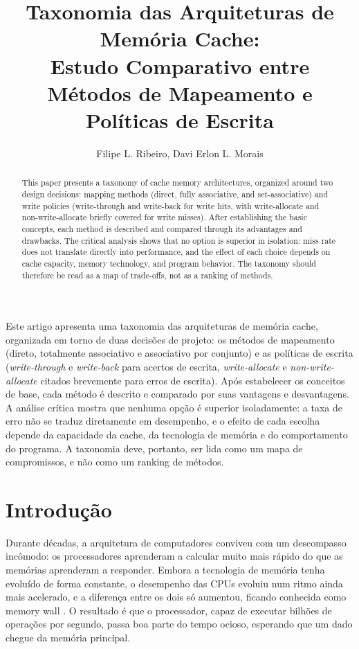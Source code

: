 \documentclass[12pt]{article}
\title{Taxonomia das Arquiteturas de Memória Cache:\\ Estudo Comparativo entre Métodos de
Mapeamento e Políticas de Escrita}
\author{Filipe L. Ribeiro, Davi Erlon L. Morais}
\begin{document}
 

\maketitle

\begin{abstract}
  This paper presents a taxonomy of cache memory architectures, organized
  around two design decisions: mapping methods (direct, fully associative,
  and set-associative) and write policies (write-through and write-back for
  write hits, with write-allocate and non-write-allocate briefly covered for
  write misses). After establishing the basic concepts, each method is
  described and compared through its advantages and drawbacks. The critical
  analysis shows that no option is superior in isolation: miss rate does not
  translate directly into performance, and the effect of each choice depends
  on cache capacity, memory technology, and program behavior. The taxonomy
  should therefore be read as a map of trade-offs, not as a ranking of
  methods.
\end{abstract}

\begin{resumo}
  Este artigo apresenta uma taxonomia das arquiteturas de memória cache,
  organizada em torno de duas decisões de projeto: os métodos de mapeamento
  (direto, totalmente associativo e associativo por conjunto) e as políticas
  de escrita (\textit{write-through} e \textit{write-back} para acertos de
  escrita, \textit{write-allocate} e \textit{non-write-allocate} citados brevemente
  para erros de escrita). Após estabelecer os conceitos de base, cada método é descrito
  e comparado por suas vantagens e desvantagens. A análise crítica mostra que
  nenhuma opção é superior isoladamente: a taxa de erro não se traduz
  diretamente em desempenho, e o efeito de cada escolha depende da
  capacidade da cache, da tecnologia de memória e do comportamento do
  programa. A taxonomia deve, portanto, ser lida como um mapa de
  compromissos, e não como um ranking de métodos.
\end{resumo}

\section{Introdução}

Durante décadas, a arquitetura de computadores conviveu com um
descompasso incômodo: os processadores aprenderam a calcular muito
mais rápido do que as memórias aprenderam a responder. Embora a
tecnologia de memória tenha evoluído de forma constante, o desempenho
das CPUs evoluiu num ritmo ainda mais acelerado, e a diferença entre
os dois só aumentou, ficando conhecida como memory wall \cite{wulf1995}.
O resultado é que o processador, capaz de executar bilhões de operações
por segundo, passa boa parte do tempo ocioso, esperando que um dado
chegue da memória principal.
\end{document}
